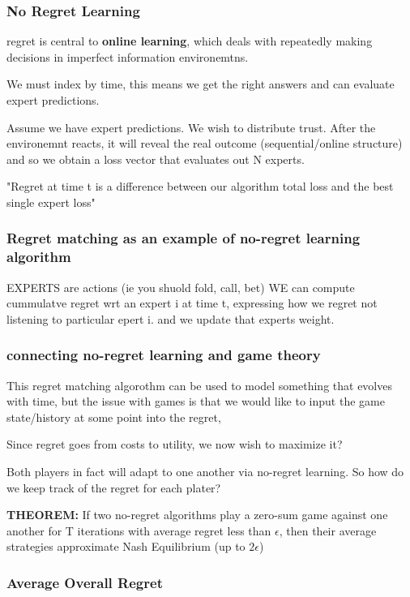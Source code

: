 \documentclass{article}
\begin{document}
\subsubsection{No Regret Learning}
regret is central to \textbf{online learning}, which deals with repeatedly making decisions in imperfect information environemtns. 

We must index by time, this means we get the right answers and can evaluate expert predictions.

Assume we have expert predictions. We wish to distribute trust. After the environemnt reacts, it will reveal the real outcome (sequential/online structure) and so we obtain a loss vector that evaluates out N experts.

"Regret at time t is a difference between our algorithm total loss and the best single expert loss" 

\subsubsection{Regret matching as an example of no-regret learning algorithm}
EXPERTS are actions (ie you shuold fold, call, bet)
WE can compute cummulatve regret wrt an expert i at time t, expressing how we regret not listening to particular epert i. and we update that experts weight.

\subsubsection{connecting no-regret learning and game theory}
This regret matching algorothm can be used to model something that evolves with time, but the issue with games is that we would like to input the game state/history at some point into the regret,

Since regret goes from costs to utility, we now wish to maximize it?

Both players in fact will adapt to one another via no-regret learning. So how do we keep track of the regret for each plater?

\textbf{THEOREM:}
If two no-regret algorithms play a zero-sum game against one another for T iterations with average regret less than $\epsilon$, then their average strategies approximate Nash Equilibrium (up to $2 \epsilon$) 

\subsubsection{Average Overall Regret}
\end{document}
